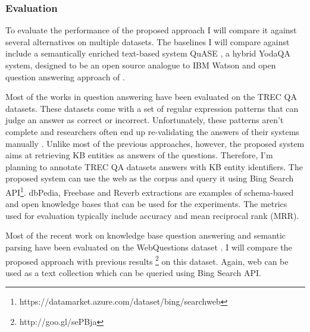 \subsubsection{Evaluation}
\label{sec:factoid_evaluation}

To evaluate the performance of the proposed approach I will compare it against several alternatives on multiple datasets.
The baselines I will compare against include a semantically enriched text-based system QuASE \cite{Sun:2015:ODQ:2736277.2741651}, a hybrid YodaQA system, designed to be an open source analogue to IBM Watson \cite{baudivs2015yodaqa} and open question answering approach of \cite{Fader:2014:OQA:2623330.2623677}.

Most of the works in question answering have been evaluated on the TREC QA datasets.
These datasets come with a set of regular expression patterns that can judge an answer as correct or incorrect.
Unfortunately, these patterns aren't complete and researchers often end up re-validating the answers of their systems manually \cite{Sun:2015:ODQ:2736277.2741651,tsai2015web}.
Unlike most of the previous approaches, however, the proposed system aims at retrieving KB entities as answers of the questions.
Therefore, I'm planning to annotate TREC QA datasets answers with KB entity identifiers.
The proposed system can use the web as the corpus and query it using Bing Search API\footnote{https://datamarket.azure.com/dataset/bing/searchweb}.
dbPedia, Freebase and Reverb extractions \cite{FaderSE11} are examples of schema-based and open knowledge bases that can be used for the experiments.
The metrics used for evaluation typically include accuracy and mean reciprocal rank (MRR).

Most of the recent work on knowledge base question answering and semantic parsing have been evaluated on the WebQuestions dataset \cite{BerantCFL13:sempre}.
I will compare the proposed approach with previous results \footnote{http://goo.gl/sePBja} on this dataset.
Again, web can be used as a text collection which can be queried using Bing Search API.

